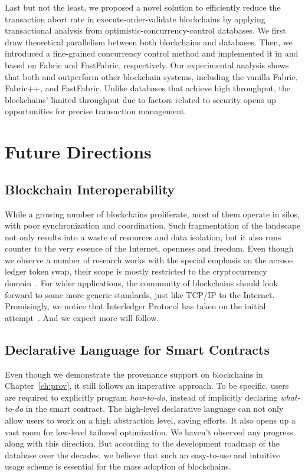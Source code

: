 Last but not the least, we proposed a novel solution to efficiently reduce the transaction abort rate in execute-order-validate blockchains by applying transactional
analysis from optimistic-concurrency-control databases. We first draw theoretical parallelism between both blockchains and databases. Then,
we introduced a fine-grained concurrency control method and
implemented it in {\fs} and {\ffs} based on
Fabric and FastFabric, respectively. 
Our experimental analysis shows that both {\fs} and {\ffs} outperform other blockchain systems, including the vanilla Fabric,
Fabric++, and FastFabric. Unlike databases that achieve high throughput, the blockchains’ limited throughput due to factors related to security opens up opportunities for precise transaction management.

\section{Future Directions}
\subsection{Blockchain Interoperability}
While a growing number of blockchains proliferate, most of them operate in silos, with poor synchronization and coordination. 
Such fragmentation of the landscape not only results into a waste of resources and data isolation, but it also runs counter to the very essence of the Internet, openness and freedom. 
Even though we observe a number of research works with the special emphasis on the across-ledger token swap, their scope is mostly restricted to the cryptocurrency domain~\cite{herlihy2018atomic,robinson2019atomic,zakhary2019atomic}. 
For wider applications, the community of blockchains should look forward to some more generic standards, just like TCP/IP to the Internet. 
Promisingly, we notice that Interledger Protocol has taken on the initial attempt~\cite{interledger}. And we expect more will follow. 

\subsection{Declarative Language for Smart Contracts}
Even though we demonstrate the provenance support on blockchains in Chapter~\ref{ch:prov}, it still follows an imperative approach.
To be specific, users are required to explicitly program \textit{how-to-do}, instead of implicitly declaring \textit{what-to-do} in the smart contract. 
The high-level declarative language can not only allow users to work on a high abstraction level, saving efforts. 
It also opens up a vast room for low-level tailored optimization. 
We haven't observed any progress along with this direction.
But according to the development roadmap of the database over the decades, we believe that such an easy-to-use and intuitive usage scheme is essential for the mass adoption of blockchains. 

